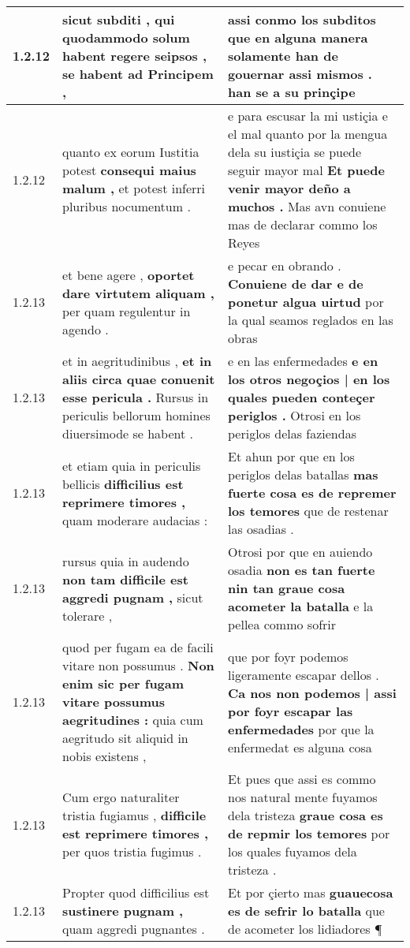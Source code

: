 \begin{tabular}{|p{1cm}|p{6.5cm}|p{6.5cm}|}
1.2.12 & sicut subditi , \textbf{ qui quodammodo solum habent regere seipsos , } se habent ad Principem , & assi conmo los subditos \textbf{ que en alguna manera solamente han de gouernar assi mismos . } han se a su prinçipe \\\hline
1.2.12 & quanto ex eorum Iustitia potest \textbf{ consequi maius malum , } et potest inferri pluribus nocumentum . & e para escusar la mi ustiçia e el mal quanto por la mengua dela su iustiçia se puede seguir mayor mal \textbf{ Et puede venir mayor deño a muchos . } Mas avn conuiene mas de declarar commo los Reyes \\\hline
1.2.13 & et bene agere , \textbf{ oportet dare virtutem aliquam , } per quam regulentur in agendo . & e pecar en obrando . \textbf{ Conuiene de dar e de ponetur algua uirtud } por la qual seamos reglados en las obras \\\hline
1.2.13 & et in aegritudinibus , \textbf{ et in aliis circa quae conuenit esse pericula . } Rursus in periculis bellorum homines diuersimode se habent . & e en las enfermedades \textbf{ e en los otros negoçios | en los quales pueden conteçer periglos . } Otrosi en los periglos delas faziendas \\\hline
1.2.13 & et etiam quia in periculis bellicis \textbf{ difficilius est reprimere timores , } quam moderare audacias : & Et ahun por que en los periglos delas batallas \textbf{ mas fuerte cosa es de repremer los temores } que de restenar las osadias . \\\hline
1.2.13 & rursus quia in audendo \textbf{ non tam difficile est aggredi pugnam , } sicut tolerare , & Otrosi por que en auiendo osadia \textbf{ non es tan fuerte nin tan graue cosa acometer la batalla } e la pellea commo sofrir \\\hline
1.2.13 & quod per fugam ea de facili vitare non possumus . \textbf{ Non enim sic per fugam vitare possumus aegritudines : } quia cum aegritudo sit aliquid in nobis existens , & que por foyr podemos ligeramente escapar dellos . \textbf{ Ca nos non podemos | assi por foyr escapar las enfermedades } por que la enfermedat es alguna cosa \\\hline
1.2.13 & Cum ergo naturaliter tristia fugiamus , \textbf{ difficile est reprimere timores , } per quos tristia fugimus . & Et pues que assi es commo nos natural mente fuyamos dela tristeza \textbf{ graue cosa es de repmir los temores } por los quales fuyamos dela tristeza . \\\hline
1.2.13 & Propter quod difficilius est \textbf{ sustinere pugnam , } quam aggredi pugnantes . & Et por çierto mas \textbf{ guauecosa es de sefrir lo batalla } que de acometer los lidiadores ¶ \\\hline

\end{tabular}
